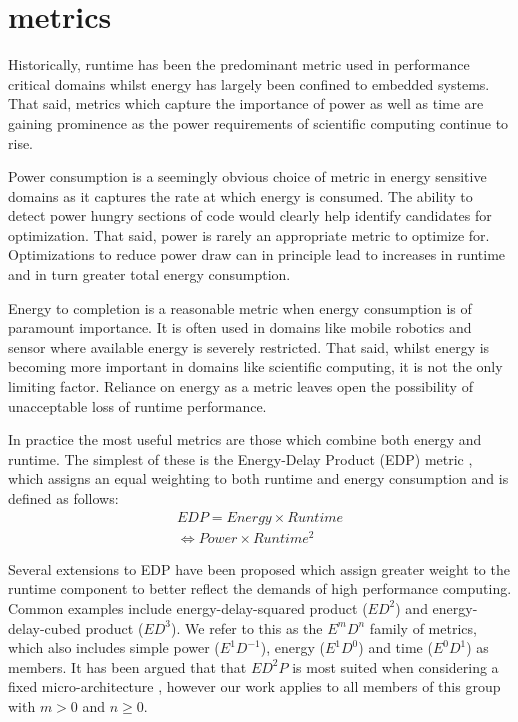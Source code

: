 \section{metrics}
\label{sec:metrics}
Historically, runtime has been the predominant metric used in performance critical domains whilst energy has largely been confined to embedded systems.
That said, metrics which capture the importance of power as well as time are gaining prominence as the power requirements of scientific computing continue to rise.


Power consumption is a seemingly obvious choice of metric in energy sensitive domains as it captures the rate at which energy is consumed.
The ability to detect power hungry sections of code would clearly help identify candidates for optimization.
That said, power is rarely an appropriate metric to optimize for.
Optimizations to reduce power draw can in principle lead to increases in runtime and in turn greater total energy consumption.

Energy to completion is a reasonable metric when energy consumption is of paramount importance.
It is often used in domains like mobile robotics and sensor where available energy is severely restricted.
That said, whilst energy is becoming more important in domains like scientific computing, it is not the only limiting factor. 
Reliance on energy as a metric leaves open the possibility of unacceptable loss of runtime performance.

In practice the most useful metrics are those which combine both energy and runtime.
The simplest of these is the Energy-Delay Product (EDP) metric \cite{gonzales:1995aa}, which assigns an equal weighting to both runtime and energy consumption and is defined as follows:
\begin{align}
  EDP = Energy \times Runtime \nonumber \\
      \Leftrightarrow Power \times Runtime^{2} 
  \label{eq:edp}
\end{align}

Several extensions to EDP have been proposed which assign greater weight to the runtime component to better reflect the demands of high performance computing.
Common examples include energy-delay-squared product ($ED^{2}$) and energy-delay-cubed product ($ED^{3}$).
We refer to this as the $E^mD^n$ family of metrics, which also includes simple power ($E^1D^{-1}$), energy ($E^1D^0$) and time ($E^0D^1$) as members.
It has been argued that that $ED^{2}P$ is most suited when considering a fixed micro-architecture \cite{brooks:2000aa}, however our work applies to all members of this group with $m > 0$ and $n \geq 0$.
